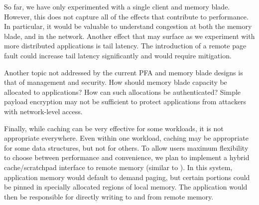 So far, we have only experimented with a single client and memory blade.
However, this does not capture all of the effects that contribute to
performance. In particular, it would be valuable to understand congestion at
both the memory blade, and in the network. Another effect that may surface as
we experiment with more distributed applications is tail latency. The
introduction of a remote page fault could increase tail latency significantly
and would require mitigation.

Another topic not addressed by the current PFA and memory blade designs is that
of management and security. How should memory blade capacity be allocated to
applications? How can such allocations be authenticated? Simple payload
encryption may not be sufficient to protect applications from attackers with
network-level access.

Finally, while caching can be very effective for some workloads, it is not
appropriate everywhere. Even within one workload, caching may be appropriate
for some data structures, but not for others. To allow users maximum
flexibility to choose between performance and convenience, we plan to implement
a hybrid cache/scratchpad interface to remote memory (similar to \cite{vls}).
In this system, application memory would default to demand paging, but certain
portions could be pinned in specially allocated regions of local memory. The
application would then be responsible for directly writing to and from remote
memory.
